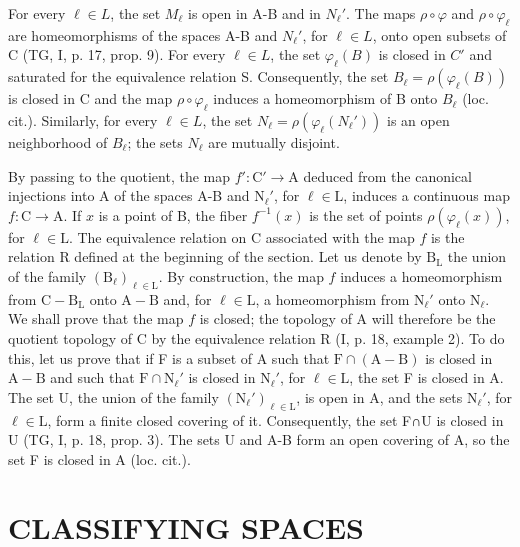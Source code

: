 For every \(\ell \in L\), the set \(M_{\ell}\) is open in A-B and in \(N_{\ell}'\). The maps \(\rho \circ \varphi\) and \(\rho \circ \varphi_{\ell}\) are homeomorphisms of the spaces A-B and \(N_{\ell}'\), for \(\ell \in L\), onto open subsets of C (TG, I, p. 17, prop. 9). For every \(\ell \in L\), the set \(\varphi_{\ell}(B)\) is closed in \(C'\) and saturated for the equivalence relation S. Consequently, the set \(B_{\ell} = \rho(\varphi_{\ell}(B))\) is closed in C and the map \(\rho \circ \varphi_{\ell}\) induces a homeomorphism of B onto \(B_{\ell}\) (loc. cit.). Similarly, for every \(\ell \in L\), the set \(N_{\ell} = \rho(\varphi_{\ell}(N_{\ell}'))\) is an open neighborhood of \(B_{\ell}\); the sets \(N_{\ell}\) are mutually disjoint.

By passing to the quotient, the map \(f' \colon \mathrm{C}' \to \mathrm{A}\) deduced from the canonical injections into A of the spaces A-B and \(\mathrm{N}_{\ell}'\), for \(\ell \in \mathrm{L}\), induces a continuous map \(f \colon \mathrm{C} \to \mathrm{A}\). If \(x\) is a point of B, the fiber \(f^{-1}(x)\) is the set of points \(\rho(\varphi_{\ell}(x))\), for \(\ell \in \mathrm{L}\). The equivalence relation on C associated with the map \(f\) is the relation R defined at the beginning of the section. Let us denote by \(\mathrm{B}_{\mathrm{L}}\) the union of the family \((\mathrm{B}_{\ell})_{\ell \in \mathrm{L}}\). By construction, the map \(f\) induces a homeomorphism from \(\mathrm{C} - \mathrm{B}_{\mathrm{L}}\) onto \(\mathrm{A} - \mathrm{B}\) and, for \(\ell \in \mathrm{L}\), a homeomorphism from \(\mathrm{N}_{\ell}'\) onto \(\mathrm{N}_{\ell}\). We shall prove that the map \(f\) is closed; the topology of A will therefore be the quotient topology of C by the equivalence relation R (I, p. 18, example 2). To do this, let us prove that if F is a subset of A such that \(\mathrm{F} \cap (\mathrm{A} - \mathrm{B})\) is closed in \(\mathrm{A} - \mathrm{B}\) and such that \(\mathrm{F} \cap \mathrm{N}_{\ell}'\) is closed in \(\mathrm{N}_{\ell}'\), for \(\ell \in \mathrm{L}\), the set F is closed in A. The set U, the union of the family \((\mathrm{N}_{\ell}')_{\ell \in \mathrm{L}}\), is open in A, and the sets \(\mathrm{N}_{\ell}'\), for \(\ell \in \mathrm{L}\), form a finite closed covering of it. Consequently, the set F∩U is closed in U (TG, I, p. 18, prop. 3). The sets U and A-B form an open covering of A, so the set F is closed in A (loc. cit.).

\section{CLASSIFYING SPACES}

